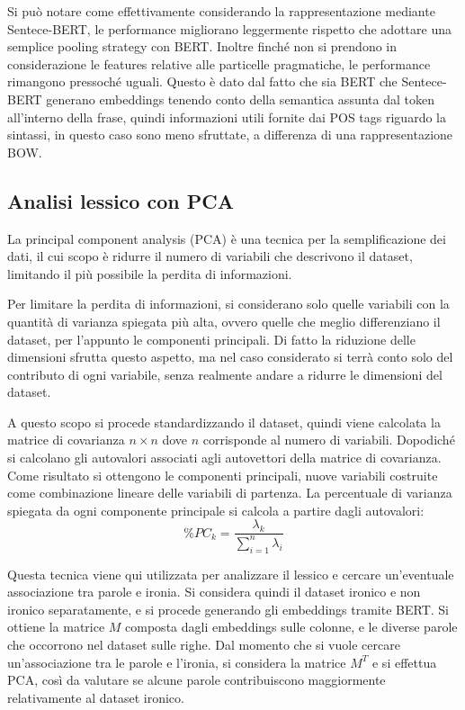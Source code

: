 \documentclass[oneside]{book}
\begin{document}
Si può notare come effettivamente considerando la rappresentazione mediante Sentece-BERT, le performance migliorano leggermente rispetto che adottare una semplice pooling strategy con BERT. Inoltre finché non si prendono in considerazione le features relative alle particelle pragmatiche, le performance rimangono pressoché uguali. Questo è dato dal fatto che sia BERT che Sentece-BERT generano embeddings tenendo conto della semantica assunta dal token all'interno della frase, quindi informazioni utili fornite dai POS tags riguardo la sintassi, in questo caso sono meno sfruttate, a differenza di una rappresentazione BOW.


\newpage

\subsection{Analisi lessico con PCA}
La principal component analysis (PCA) è una tecnica per la semplificazione dei dati, il cui scopo è ridurre il numero di variabili che descrivono il dataset, limitando il più possibile la perdita di informazioni.

Per limitare la perdita di informazioni, si considerano solo quelle variabili con la quantità di varianza spiegata più alta, ovvero quelle che meglio differenziano il dataset, per l'appunto le componenti principali. Di fatto la riduzione delle dimensioni sfrutta questo aspetto, ma nel caso considerato si terrà conto solo del contributo di ogni variabile, senza realmente andare a ridurre le dimensioni del dataset.

A questo scopo si procede standardizzando il dataset, quindi viene calcolata la matrice di covarianza $n \times n$ dove $n$ corrisponde al numero di variabili. Dopodiché si calcolano gli autovalori associati agli autovettori della matrice di covarianza. Come risultato si ottengono le componenti principali, nuove variabili costruite come combinazione lineare delle variabili di partenza. La percentuale di varianza spiegata da ogni componente principale si calcola a partire dagli autovalori: $$\%PC_k = \frac{\lambda_k}{\sum_{i=1}^n \lambda_i}$$

Questa tecnica viene qui utilizzata per analizzare il lessico e cercare un'eventuale associazione tra parole e ironia. Si considera quindi il dataset ironico e non ironico separatamente, e si procede generando gli embeddings tramite BERT. Si ottiene la matrice $M$ composta dagli embeddings sulle colonne, e le diverse parole che occorrono nel dataset sulle righe. Dal momento che si vuole cercare un'associazione tra le parole e l'ironia, si considera la matrice $M^T$ e si effettua PCA, così da valutare se alcune parole contribuiscono maggiormente relativamente al dataset ironico.
\end{document}
